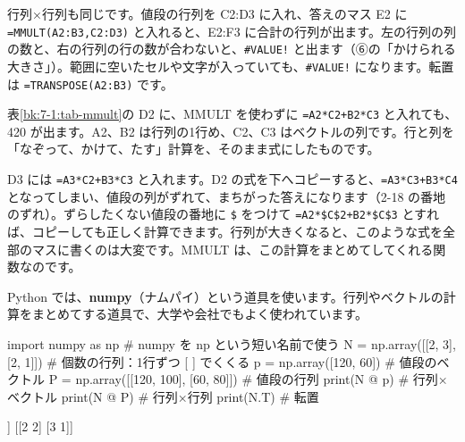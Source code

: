 行列×行列も同じです。値段の行列を C2:D3 に入れ、答えのマス E2 に \texttt{=MMULT(A2:B3,C2:D3)} と入れると、E2:F3 に合計の行列が出ます。左の行列の列の数と、右の行列の行の数が合わないと、\texttt{\#VALUE!} と出ます（⑥の「かけられる大きさ」）。範囲に空いたセルや文字が入っていても、\texttt{\#VALUE!} になります。転置は \texttt{=TRANSPOSE(A2:B3)} です。

\begin{motto}[3]
表\ref{bk:7-1:tab-mmult}の D2 に、MMULT を使わずに \texttt{=A2*C2+B2*C3} と入れても、420 が出ます。A2、B2 は行列の1行め、C2、C3 はベクトルの列です。行と列を「なぞって、かけて、たす」計算を、そのまま式にしたものです。
\begin{bkcenter}
\end{bkcenter}
D3 には \texttt{=A3*C2+B3*C3} と入れます。D2 の式を下へコピーすると、\texttt{=A3*C3+B3*C4} となってしまい、値段の列がずれて、まちがった答えになります（2-18 の番地のずれ）。ずらしたくない値段の番地に \texttt{\$} をつけて \texttt{=A2*\$C\$2+B2*\$C\$3} とすれば、コピーしても正しく計算できます。行列が大きくなると、このような式を全部のマスに書くのは大変です。MMULT は、この計算をまとめてしてくれる関数なのです。
\end{motto}

Python では、\textbf{numpy}（ナムパイ）という道具を使います。行列やベクトルの計算をまとめてする道具で、大学や会社でもよく使われています。

\begin{bkcode}[Python]
import numpy as np              \# numpy を np という短い名前で使う
N = np.array([[2, 3],
              [2, 1]])          \# 個数の行列：1行ずつ [ ] でくくる
p = np.array([120, 60])         \# 値段のベクトル
P = np.array([[120, 100],
              [60, 80]])        \# 値段の行列
print(N @ p)                    \# 行列×ベクトル
print(N @ P)                    \# 行列×行列
print(N.T)                      \# 転置
\end{bkcode}
\begin{bkcodeout}[実行結果]
[420 300]
[[420 440]
 [300 280]]
[[2 2]
 [3 1]]
\end{bkcodeout}

